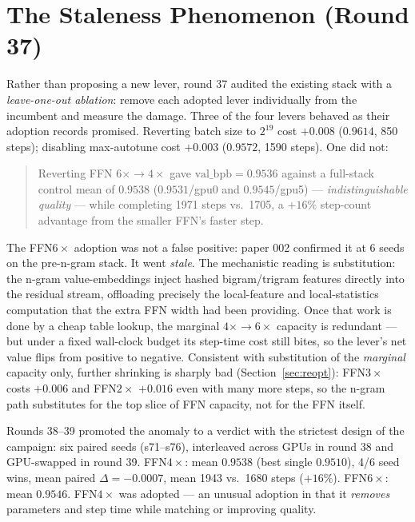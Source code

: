 \documentclass{article}
\newcommand{\valbpb}{\mathrm{val\_bpb}}
\begin{document}
\section{The Staleness Phenomenon (Round 37)}
\label{sec:staleness}

Rather than proposing a new lever, round 37 audited the existing stack with a \emph{leave-one-out ablation}: remove each adopted lever individually from the incumbent and measure the damage. Three of the four levers behaved as their adoption records promised. Reverting batch size to $2^{19}$ cost $+0.008$ ($0.9614$, 850 steps); disabling max-autotune cost $+0.003$ ($0.9572$, 1590 steps). One did not:

\begin{quote}
Reverting FFN $6\times \rightarrow 4\times$ gave $\valbpb = 0.9536$ against a full-stack control mean of $0.9538$ ($0.9531$/gpu0 and $0.9545$/gpu5) --- \emph{indistinguishable quality} --- while completing 1971 steps vs.\ 1705, a $+16\%$ step-count advantage from the smaller FFN's faster step.
\end{quote}

The FFN$6\times$ adoption was not a false positive: paper 002 confirmed it at 6 seeds on the pre-n-gram stack. It went \emph{stale}. The mechanistic reading is substitution: the n-gram value-embeddings inject hashed bigram/trigram features directly into the residual stream, offloading precisely the local-feature and local-statistics computation that the extra FFN width had been providing. Once that work is done by a cheap table lookup, the marginal $4\times \rightarrow 6\times$ capacity is redundant --- but under a fixed wall-clock budget its step-time cost still bites, so the lever's net value flips from positive to negative. Consistent with substitution of the \emph{marginal} capacity only, further shrinking is sharply bad (Section~\ref{sec:reopt}): FFN$3\times$ costs $+0.006$ and FFN$2\times$ $+0.016$ even with many more steps, so the n-gram path substitutes for the top slice of FFN capacity, not for the FFN itself.

Rounds 38--39 promoted the anomaly to a verdict with the strictest design of the campaign: six paired seeds (s71--s76), interleaved across GPUs in round 38 and GPU-swapped in round 39. FFN$4\times$: mean $0.9538$ (best single $0.9510$), 4/6 seed wins, mean paired $\Delta = -0.0007$, mean 1943 vs.\ 1680 steps ($+16\%$). FFN$6\times$: mean $0.9546$. FFN$4\times$ was adopted --- an unusual adoption in that it \emph{removes} parameters and step time while matching or improving quality.
\end{document}

